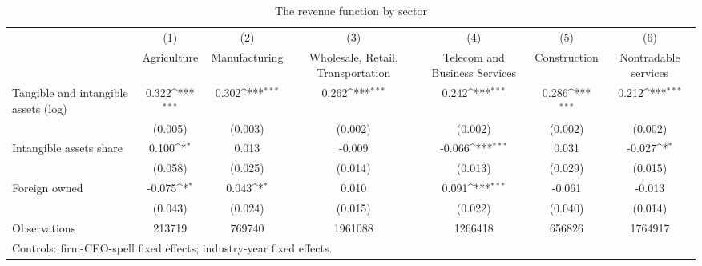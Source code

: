 \begin{table}[htbp]\centering
\def\sym#1{\ifmmode^{#1}\else\(^{#1}\)\fi}
\caption{The revenue function by sector}
\begin{tabular}{l*{6}{c}}
\hline\hline
                    &\multicolumn{1}{c}{(1)}&\multicolumn{1}{c}{(2)}&\multicolumn{1}{c}{(3)}&\multicolumn{1}{c}{(4)}&\multicolumn{1}{c}{(5)}&\multicolumn{1}{c}{(6)}\\
                    &\multicolumn{1}{c}{Agriculture}&\multicolumn{1}{c}{Manufacturing}&\multicolumn{1}{c}{Wholesale, Retail, Transportation}&\multicolumn{1}{c}{Telecom and Business Services}&\multicolumn{1}{c}{Construction}&\multicolumn{1}{c}{Nontradable services}\\
\hline
Tangible and intangible assets (log)&       0.322\sym{***}&       0.302\sym{***}&       0.262\sym{***}&       0.242\sym{***}&       0.286\sym{***}&       0.212\sym{***}\\
                    &     (0.005)         &     (0.003)         &     (0.002)         &     (0.002)         &     (0.002)         &     (0.002)         \\
[1em]
Intangible assets share&       0.100\sym{*}  &       0.013         &      -0.009         &      -0.066\sym{***}&       0.031         &      -0.027\sym{*}  \\
                    &     (0.058)         &     (0.025)         &     (0.014)         &     (0.013)         &     (0.029)         &     (0.015)         \\
[1em]
Foreign owned       &      -0.075\sym{*}  &       0.043\sym{*}  &       0.010         &       0.091\sym{***}&      -0.061         &      -0.013         \\
                    &     (0.043)         &     (0.024)         &     (0.015)         &     (0.022)         &     (0.040)         &     (0.014)         \\
\hline
Observations        &      213719         &      769740         &     1961088         &     1266418         &      656826         &     1764917         \\
\hline\hline
\multicolumn{7}{l}{\footnotesize Controls: firm-CEO-spell fixed effects; industry-year fixed effects.}\\
\end{tabular}
\end{table}
